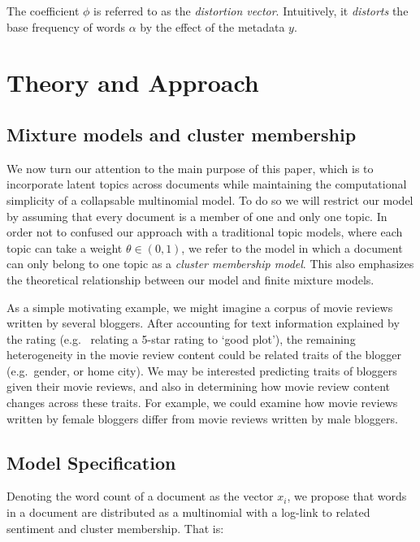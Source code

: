 \documentclass[12pt]{article}
\begin{document}
The coefficient $\phi$ is referred to as the \textit{distortion vector}. Intuitively, it \textit{distorts} the base frequency of words $\alpha$ by the effect of the metadata $y$. 

\section{Theory and Approach}\label{theory-and-approach}

\subsection{Mixture models and cluster
membership}\label{mixture-models-and-cluster-membership}

We now turn our attention to the main purpose of this paper, which is to
incorporate latent topics across documents while maintaining the computational simplicity of a collapsable multinomial model. To do so we will restrict our model by assuming that every document is a member of one and only one topic. In order not to confused our approach with a traditional topic models, where each topic can take a weight $\theta \in (0,1)$, we refer to the model in which a document can only belong to one topic as a \textit{cluster membership model}. This also emphasizes the theoretical relationship between our model and finite mixture models. 

As a simple motivating example, we might imagine a corpus of
movie reviews written by several bloggers. After accounting for text
information explained by the rating (e.g. ~relating a 5-star rating to
`good plot'), the remaining heterogeneity in the movie review
content could be related traits of the blogger (e.g.~gender, or home
city). We may be interested predicting traits of bloggers
given their movie reviews, and also in determining how movie review
content changes across these traits. For example, we could examine how movie reviews written by 
female bloggers differ from movie reviews written by male bloggers.




\subsection{Model Specification}\label{model-specification}

Denoting the word count of a document as the vector $x_i$, we propose
that words in a document are distributed as a multinomial with a
log-link to related sentiment and cluster membership. That is:
\end{document}

